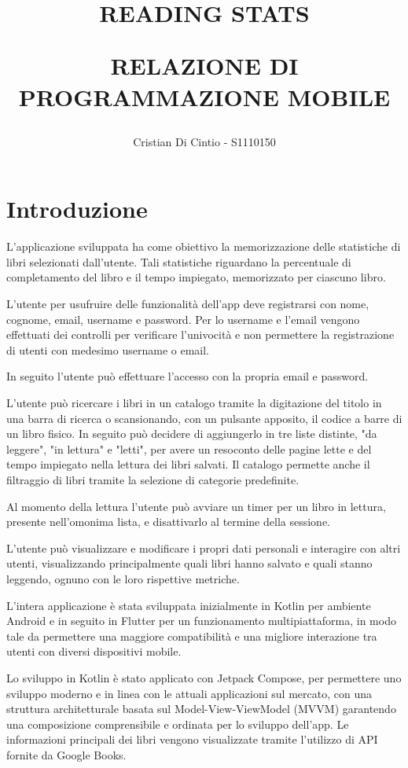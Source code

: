 \documentclass{article}
\author{Cristian Di Cintio - S1110150}
\date{}
\title{READING STATS\par \large RELAZIONE DI PROGRAMMAZIONE MOBILE}
\begin{document}
\maketitle
\tableofcontents
\newpage

\section{Introduzione}

L'applicazione sviluppata ha come obiettivo la memorizzazione delle statistiche di libri selezionati dall'utente. Tali statistiche riguardano la percentuale di completamento del libro e il tempo impiegato, memorizzato per ciascuno libro.

L'utente per usufruire delle funzionalità dell'app deve registrarsi con nome, cognome, email, username e password. Per lo username e l'email vengono effettuati dei controlli per verificare l'univocità e non permettere la registrazione di utenti con medesimo username o email.

In seguito l'utente può effettuare l'accesso con la propria email e password.

L'utente può ricercare i libri in un catalogo tramite la digitazione del titolo in una barra di ricerca o scansionando, con un pulsante apposito, il codice a barre di un libro fisico. In seguito può decidere di aggiungerlo in tre liste distinte, "da leggere", "in lettura" e "letti", 
per avere un resoconto delle pagine lette e del tempo impiegato nella lettura dei libri salvati. Il catalogo permette anche il filtraggio di libri tramite la selezione di categorie predefinite.

Al momento della lettura l'utente può avviare un timer per un libro in lettura, presente nell'omonima lista, e disattivarlo al termine della sessione.

L'utente può visualizzare e modificare i propri dati personali e interagire con altri utenti, visualizzando principalmente quali libri hanno salvato e quali stanno leggendo, ognuno con le loro rispettive metriche.

L'intera applicazione è stata sviluppata inizialmente in Kotlin per ambiente Android e in seguito in Flutter per un funzionamento multipiattaforma, in modo tale da permettere una maggiore compatibilità e una migliore interazione tra utenti con diversi dispositivi mobile.

Lo sviluppo in Kotlin è stato applicato con Jetpack Compose, per permettere uno sviluppo moderno e in linea con le attuali applicazioni sul mercato, con una struttura architetturale basata sul Model-View-ViewModel (MVVM) garantendo una composizione comprensibile e ordinata per lo sviluppo dell'app.
Le informazioni principali dei libri vengono visualizzate tramite l'utilizzo di API fornite da Google Books.
\end{document}
